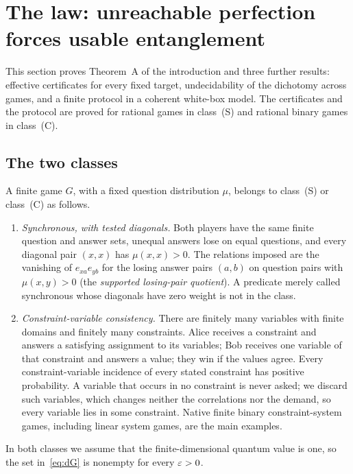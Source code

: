 \section{The law: unreachable perfection forces usable entanglement}\label{sec:law}

This section proves Theorem~A of the introduction and three further results: effective certificates for every fixed
target, undecidability of the dichotomy across games, and a finite protocol in a coherent white-box model. The certificates and
the protocol are proved for rational games in class~(S) and rational binary games in class~(C).

\subsection{The two classes}\label{sec:law-classes}

\begin{definition}\label{def:law-classes}
A finite game $G$, with a fixed question distribution $\mu$, belongs to class~(S) or class~(C) as follows.
\begin{enumerate}[label=(\Alph*),itemsep=2pt]
\item[(S)] \emph{Synchronous, with tested diagonals.} Both players have the same finite question and answer sets, unequal
answers lose on equal questions, and every diagonal pair $(x,x)$ has $\mu(x,x)>0$. The relations imposed are the vanishing
of $e_{xa}e_{yb}$ for the losing answer pairs $(a,b)$ on question pairs with $\mu(x,y)>0$ (the \emph{supported losing-pair
quotient}). A predicate merely called synchronous whose diagonals have zero weight is not in the class.
\item[(C)] \emph{Constraint-variable consistency.} There are finitely many variables with finite domains and finitely many
constraints. Alice receives a constraint and answers a satisfying assignment to its variables; Bob receives one variable of
that constraint and answers a value; they win if the values agree. Every constraint-variable incidence of every stated
constraint has positive probability. A variable that occurs in no constraint is never asked; we discard such variables,
which changes neither the correlations nor the demand, so every variable lies in some constraint. Native finite binary constraint-system games, including linear system games, are
the main examples.
\end{enumerate}
In both classes we assume that the finite-dimensional quantum value is one, so the set in~\eqref{eq:dG} is nonempty for
every $\varepsilon>0$.
\end{definition}

